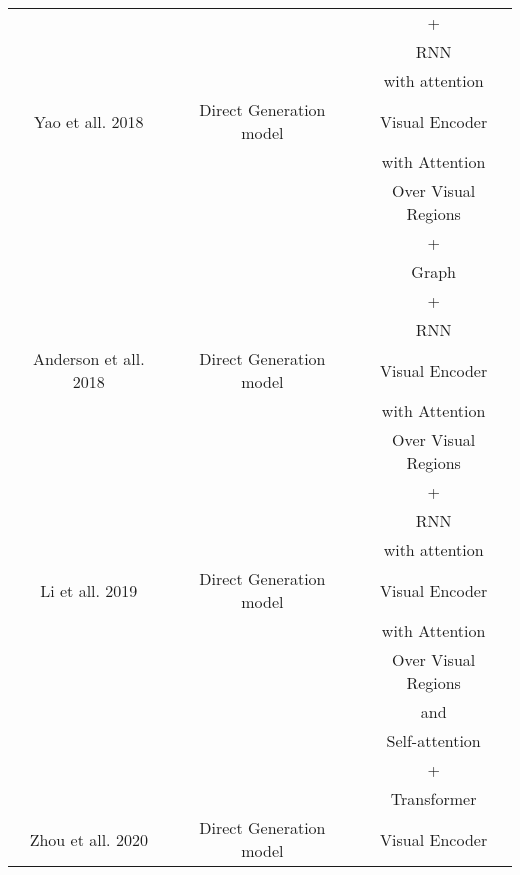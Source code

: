 \begin{table}[H]
\begin{center}
\begin{tabular}{||c c c||}
                    ~						   &              ~          &        + \\
 				    ~						   &              ~          &        RNN \\
 				    ~						   &              ~          &        with attention \\
 \hline
 Yao et all. \cite{yao2018exploring} 2018      & Direct Generation model & Visual Encoder \\
  					~						   &              ~          &        with Attention \\
                    ~						   &              ~          &        Over Visual Regions \\
                    ~						   &              ~          &        + \\
                    ~						   &              ~          &        Graph \\
                    ~						   &              ~          &        + \\
 				    ~						   &              ~          &        RNN \\
 \hline
 Anderson et all. \cite{anderson2018bottom} 2018 & Direct Generation model & Visual Encoder  \\
   					~						   &              ~          & with Attention \\
  					~						   &              ~          & Over Visual Regions \\
  					~						   &              ~          & + \\
  					~						   &              ~          & RNN \\
  					~						   &              ~          & with attention \\
 \hline
 Li et all. \cite{li2019entangled} 2019 & Direct Generation model & Visual Encoder  \\
    			    ~						   &              ~          & with Attention \\
  					~						   &              ~          & Over Visual Regions \\
  					~						   &              ~          & and  \\
  					~						   &              ~          & Self-attention \\
  					~						   &              ~          & + \\
  					~						   &              ~          & Transformer \\
 \hline
 Zhou et all. \cite{zhou2020unified} 2020      & Direct Generation model & Visual Encoder  \\

\end{tabular}
\end{center}
\end{table}
